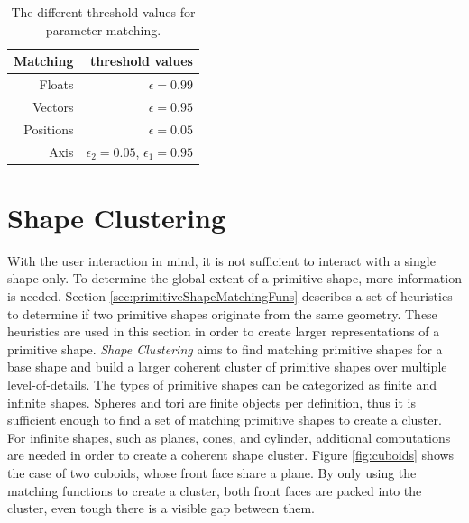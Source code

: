 \begin{table}
\centering
\begin{tabular}{ r | r }
    Matching    & threshold values \\
    \hline
  Floats         & $\epsilon = 0.99$ \\
    Vectors     & $\epsilon = 0.95$ \\
  Positions & $\epsilon = 0.05$ \\ 
    Axis             & $\epsilon_2 = 0.05$, $\epsilon_1 = 0.95$ \\  

\end{tabular}
\caption[Different threshold values for parameter matching]
{The different threshold values for parameter matching.}
\label{tab:matchingThresholds}
\end{table}


\section{Shape Clustering}
\label{sec:shapeClustering}

With the user interaction in mind, it is not sufficient to interact with a single shape only. To determine the global extent of a primitive shape, more information is needed. Section \ref{sec:primitiveShapeMatchingFuns} describes a set of heuristics to determine if two primitive shapes originate from the same geometry. These heuristics are used in this section in order to create larger representations of a primitive shape. 
\textit{Shape Clustering} aims to find matching primitive shapes for a base shape and build a larger coherent cluster of primitive shapes over multiple level-of-details. The types of primitive shapes can be categorized as finite and infinite shapes. Spheres and tori are finite objects per definition, thus it is sufficient enough to find a set of matching primitive shapes to create a cluster. For infinite shapes, such as planes, cones, and cylinder, additional computations are needed in order to create a coherent shape cluster. Figure \ref{fig:cuboids} shows the case of two cuboids, whose front face share a plane. By only using the matching functions to create a cluster, both front faces are packed into the cluster, even tough there is a visible gap between them.

